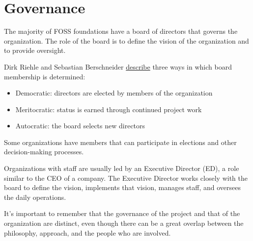 


\chapter{Governance}

The majority of FOSS foundations have a board of directors that governs the organization.  The role of the board is to define the vision of the organization and to provide oversight.

Dirk Riehle and Sebastian Berschneider \href{https://doi.org/10.1007/978-3-642-33442-9_2}{describe} three ways in which board membership is determined:

\begin{itemize}

\item Democratic: directors are elected by members of the organization

\item Meritocratic: status is earned through continued project work

\item Autocratic: the board selects new directors

\end{itemize}

Some organizations have members that can participate in elections and other decision-making processes.

Organizations with staff are usually led by an Executive Director (ED), a role similar to the CEO of a company.  The Executive Director works closely with the board to define the vision, implements that vision, manages staff, and oversees the daily operations.

It's important to remember that the governance of the project and that of the organization are distinct, even though there can be a great overlap between the philosophy, approach, and the people who are involved.

